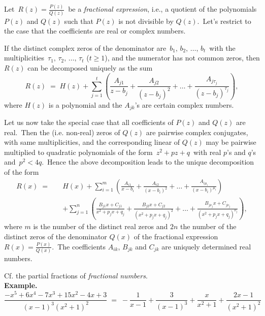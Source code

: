 \documentclass[12pt]{article}
\begin{document}

Let\, $R(z) = \frac{P(z)}{Q(z)}$\, be a {\em fractional expression}, i.e., a quotient of the polynomials $P(z)$ and $Q(z)$ such that $P(z)$ is not divisible by $Q(z)$.\, Let's restrict to the case that the coefficients are real or complex numbers. 

If the distinct complex zeros of the denominator are\, $b_1,\,b_2,\,\ldots,\,b_t$\, with the multiplicities\, $\tau_1,\,\tau_2,\,\ldots,\,\tau_t$ ($t \ge 1$), and the numerator has not common zeros, then $R(z)$ can be decomposed uniquely as the sum
$$R(z) \;=\; H(z)+
\sum_{j=1}^t\left(\frac{A_{j1}}{z-b_j}+\frac{A_{j2}}{(z-b_j)^2}+\ldots
        +\frac{A_{j\tau_j}}{(z-b_j)^{\tau_j}}\right),$$
where $H(z)$ is a polynomial and the $A_{jk}$'s are certain complex numbers.

Let us now take the special case that all coefficients of $P(z)$ and $Q(z)$ are real.\, Then the  (i.e. non-real) zeros of $Q(z)$ are pairwise complex conjugates, with same multiplicities, and the corresponding linear  of $Q(z)$ may be pairwise multiplied to quadratic polynomials of the form\, $z^2\!+\!pz\!+\!q$\, with real $p$'s and $q$'s and\, $p^2 < 4q$.\, Hence the above decomposition leads to the unique decomposition of the form
\begin{align*}R(x) \;=\quad & H(x)+
\sum_{i=1}^m\left(\frac{A_{i1}}{x-b_i}+\frac{A_{i2}}{(x-b_i)^2}+\ldots
+\frac{A_{i\mu_i}}{(x-b_i)^{\mu_i}}\right)\\
&+\sum_{j=1}^n\left(\frac{B_{j1}x+C_{j1}}{x^2+p_jx+q_j}+
\frac{B_{j2}x+C_{j2}}{( x^2+p_jx+q_j)^2}+\ldots
+\frac{B_{j\nu_j}x+C_{j\nu_j}}{( x^2+p_jx+q_j)^{\nu_j}}\right),
\end{align*}
where $m$ is the number of the distinct real zeros and $2n$ the number of the distinct  zeros of the denominator $Q(x)$ of the fractional expression\, $R(x) = \frac{P(x)}{Q(x)}$.\, The coefficients $A_{ik}$, $B_{jk}$ and $C_{jk}$ are uniquely determined real numbers.

Cf. the partial fractions of {\em fractional numbers}.\\

\textbf{Example.} 
$$\frac{-x^5\!+\!6x^4\!-\!7x^3\!+\!15x^2\!-\!4x\!+\!3}
{(x\!-\!1)^3(x^2\!+\!1)^2} \;=\;
-\frac{1}{x\!-\!1}\!+\!\frac{3}{(x\!-\!1)^3}\!+
\!\frac{x}{x^2\!+\!1}\!+\!\frac{2x\!-\!1}{(x^2\!+\!1)^2}$$
\end{document}
